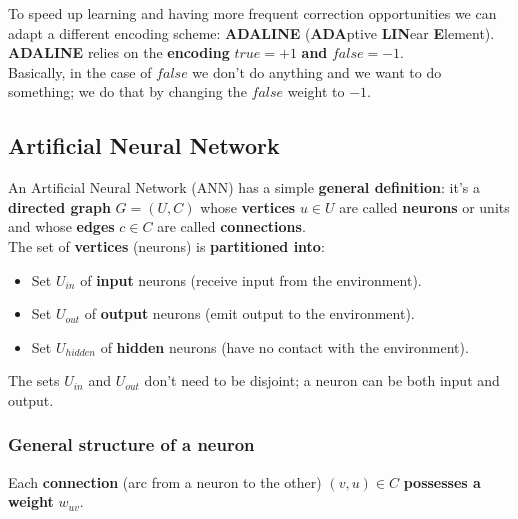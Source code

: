 To speed up learning and having more frequent correction opportunities we can adapt a different encoding scheme: \textbf{ADALINE} (\textbf{ADA}ptive \textbf{LIN}ear \textbf{E}lement).\\

\textbf{ADALINE} relies on the \textbf{encoding} $true = +1$ \textbf{and} $false = -1$.\\

Basically, in the case of $false$ we don't do anything and we want to do something; we do that by changing the $false$ weight to $-1$.\\


\newpage

\subsection{Artificial Neural Network}
An Artificial Neural Network (ANN) has a simple \textbf{general definition}: it's a \textbf{directed graph} $G= (U,C)$ whose \textbf{vertices} $u \in U$ are called \textbf{neurons} or units and whose \textbf{edges} $c \in C$ are called \textbf{connections}.\\

The set of \textbf{vertices} (neurons) is \textbf{partitioned into}: 
\begin{itemize}
	\item Set $U_{in}$ of \textbf{input} neurons (receive input from the environment).\\
	
	\item Set $U_{out}$ of \textbf{output} neurons (emit output to the environment).\\
	
	\item Set $U_{hidden}$ of \textbf{hidden} neurons (have no contact with the environment).\\
	
\end{itemize}
The sets $U_{in}$ and $U_{out}$ don't need to be disjoint; a neuron can be both input and output.\\



\subsubsection{General structure of a neuron}
Each \textbf{connection} (arc from a neuron to the other) $(v,u) \in C$ \textbf{possesses a weight} $w_{uv}$.\\

